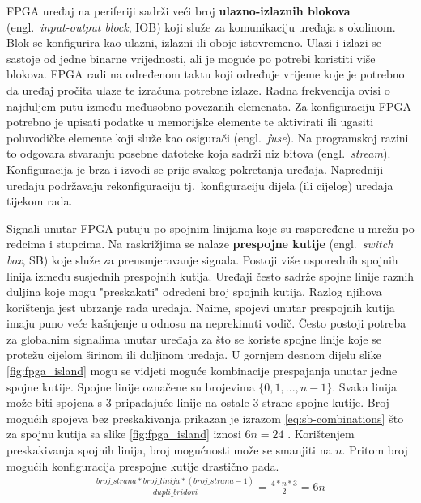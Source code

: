\documentclass[times, utf8, diplomski]{fer}
\begin{document}
FPGA uređaj na periferiji sadrži veći broj \textbf{ulazno-izlaznih blokova} (engl.~\textit{input-output block}, IOB) koji služe za komunikaciju uređaja s okolinom. Blok se konfigurira kao ulazni, izlazni ili oboje istovremeno. Ulazi i izlazi se sastoje od jedne binarne vrijednosti, ali je moguće po potrebi koristiti više blokova. FPGA radi na određenom taktu koji određuje vrijeme koje je potrebno da uređaj pročita ulaze te izračuna potrebne izlaze. Radna frekvencija ovisi o najduljem putu između međusobno povezanih elemenata. Za konfiguraciju FPGA potrebno je upisati podatke u memorijske elemente te aktivirati ili ugasiti poluvodičke elemente koji služe kao osigurači (engl.~\textit{fuse}). Na programskoj razini to odgovara stvaranju posebne datoteke koja sadrži niz bitova (engl.~\textit{stream}). Konfiguracija je brza i izvodi se prije svakog pokretanja uređaja. Napredniji uređaju podržavaju rekonfiguraciju tj.~konfiguraciju dijela (ili cijelog) uređaja tijekom rada.

Signali unutar FPGA putuju po spojnim linijama koje su raspoređene u mrežu po redcima i stupcima. Na raskrižjima se nalaze \textbf{prespojne kutije} (engl.~\textit{switch box}, SB) koje služe za preusmjeravanje signala. Postoji više usporednih spojnih linija između susjednih prespojnih kutija. Uređaji često sadrže spojne linije raznih duljina koje mogu "preskakati" određeni broj spojnih kutija. Razlog njihova korištenja jest ubrzanje rada uređaja. Naime, spojevi unutar prespojnih kutija imaju puno veće kašnjenje u odnosu na neprekinuti vodič. Često postoji potreba za globalnim signalima unutar uređaja za što se koriste spojne linije koje se protežu cijelom širinom ili duljinom uređaja. U gornjem desnom dijelu slike \ref{fig:fpga_island} mogu se vidjeti moguće kombinacije prespajanja unutar jedne spojne kutije. Spojne linije označene su brojevima $\{0, 1, ..., n-1\}$. Svaka linija može biti spojena s $3$ pripadajuće linije na ostale $3$ strane spojne kutije. Broj mogućih spojeva bez preskakivanja prikazan je izrazom \ref{eq:sb-combinations} što za spojnu kutija sa slike \ref{fig:fpga_island} iznosi $6n = 24$ \cite{article:switch_box}. Korištenjem preskakivanja spojnih linija, broj mogućnosti može se smanjiti na $n$. Pritom broj mogućih konfiguracija prespojne kutije drastično pada.
%
\begin{gather}
	\label{eq:sb-combinations}
	\frac{broj\_strana * broj\_linija * (broj\_strana - 1)}{dupli\_bridovi} = \frac{4 * n * 3}{2} = 6n
\end{gather}
\end{document}
